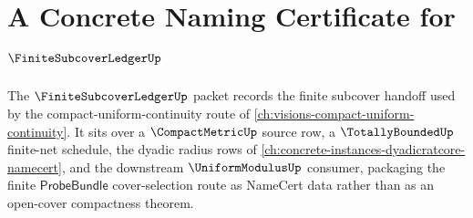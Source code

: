 \chapter{A Concrete Naming Certificate for $\FiniteSubcoverLedgerUp$}
\label{ch:concrete-instances-finite-subcover-ledger-namecert}

The $\FiniteSubcoverLedgerUp$ packet records the finite subcover handoff used by the compact-uniform-continuity route of \autoref{ch:visions-compact-uniform-continuity}. It sits over a $\CompactMetricUp$ source row, a $\TotallyBoundedUp$ finite-net schedule, the dyadic radius rows of \autoref{ch:concrete-instances-dyadicratcore-namecert}, and the downstream $\UniformModulusUp$ consumer, packaging the finite $\mathsf{ProbeBundle}$ cover-selection route as NameCert data rather than as an open-cover compactness theorem.

